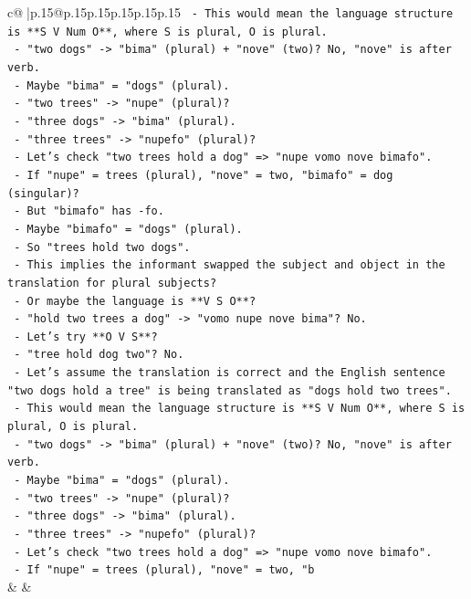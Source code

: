 \documentclass{article}
\begin{document}
{\begin{supertabular}{c@{$\;$}|p{.15\linewidth}@{}p{.15\linewidth}p{.15\linewidth}p{.15\linewidth}p{.15\linewidth}p{.15\linewidth}}
{{{\texttt{             {-} This would mean the language structure is **S V Num O**, where S is plural, O is plural.} \\
\texttt{             {-} "two dogs" {-}> "bima" (plural) + "nove" (two)? No, "nove" is after verb.} \\
\texttt{             {-} Maybe "bima" = "dogs" (plural).} \\
\texttt{             {-} "two trees" {-}> "nupe" (plural)?} \\
\texttt{             {-} "three dogs" {-}> "bima" (plural).} \\
\texttt{             {-} "three trees" {-}> "nupefo" (plural)?} \\
\texttt{             {-} Let's check "two trees hold a dog" => "nupe vomo nove bimafo".} \\
\texttt{             {-} If "nupe" = trees (plural), "nove" = two, "bimafo" = dog (singular)?} \\
\texttt{             {-} But "bimafo" has {-}fo.} \\
\texttt{             {-} Maybe "bimafo" = "dogs" (plural).} \\
\texttt{             {-} So "trees hold two dogs".} \\
\texttt{             {-} This implies the informant swapped the subject and object in the translation for plural subjects?} \\
\texttt{             {-} Or maybe the language is **V S O**?} \\
\texttt{             {-} "hold two trees a dog" {-}> "vomo nupe nove bima"? No.} \\
\texttt{             {-} Let's try **O V S**?} \\
\texttt{             {-} "tree hold dog two"? No.} \\
\texttt{             {-} Let's assume the translation is correct and the English sentence "two dogs hold a tree" is being translated as "dogs hold two trees".} \\
\texttt{             {-} This would mean the language structure is **S V Num O**, where S is plural, O is plural.} \\
\texttt{             {-} "two dogs" {-}> "bima" (plural) + "nove" (two)? No, "nove" is after verb.} \\
\texttt{             {-} Maybe "bima" = "dogs" (plural).} \\
\texttt{             {-} "two trees" {-}> "nupe" (plural)?} \\
\texttt{             {-} "three dogs" {-}> "bima" (plural).} \\
\texttt{             {-} "three trees" {-}> "nupefo" (plural)?} \\
\texttt{             {-} Let's check "two trees hold a dog" => "nupe vomo nove bimafo".} \\
\texttt{             {-} If "nupe" = trees (plural), "nove" = two, "b} \\
            }
        }
    }
    & & \\ \\


\end{supertabular}}
\end{document}
